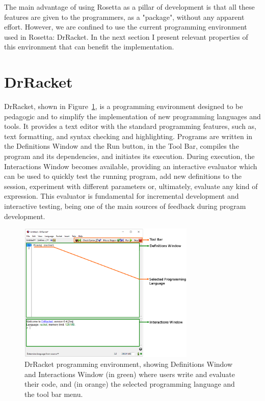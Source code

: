 The main advantage of using Rosetta as a pillar of development is that all these features are given to the programmers, as a "package", without any apparent effort. However, we are confined to use the current programming environment used in Rosetta: DrRacket. In the next section I present relevant properties of this environment that can benefit the implementation. 

\section{DrRacket}

DrRacket, shown in Figure~\ref{fig:drracket-gui}, is a programming environment designed to be pedagogic and to simplify the implementation of new programming languages and tools. It provides a text editor with the standard programming features, such as, text formatting, and syntax checking and highlighting. Programs are written in the Definitions Window and the Run button, in the Tool Bar, compiles the program and its dependencies, and initiates its execution. During execution, the Interactions Window becomes available, providing an interactive evaluator which can be used to quickly test the running program, add new definitions to the session, experiment with different parameters or, ultimately, evaluate any kind of expression. This evaluator is fundamental for incremental development and interactive testing, being one of the main sources of feedback during program development.

\begin{figure}[!htbp]
  \centering
  \includegraphics[width=0.75\textwidth]{images/drracket-gui}
    \caption{DrRacket programming environment, showing Definitions Window and Interactions Window (in green) where users write and evaluate their code, and (in orange) the selected programming language and the tool bar menu.}
  \label{fig:drracket-gui}
\end{figure}

